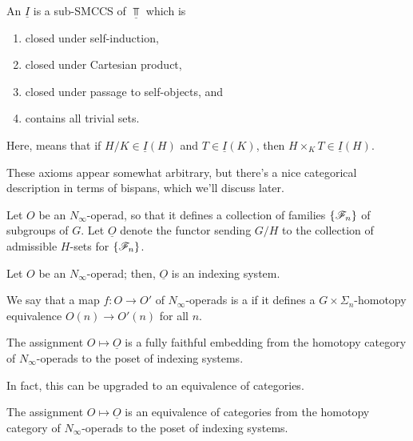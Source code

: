 \begin{defn}
An  $\underline I$ is a sub-SMCCS of $\underline\Top$ which
is
\begin{enumerate}
	\item closed under self-induction,
	\item closed under Cartesian product,
	\item closed under passage to self-objects, and
	\item contains all trivial sets.
\end{enumerate}
Here,  means that if $H/K\in\underline I(H)$ and $T\in\underline I(K)$, then $H\times_K
T\in\underline I(H)$.
\end{defn}
These axioms appear somewhat arbitrary, but there's a nice categorical description in terms of bispans, which we'll
discuss later.
\begin{defn}
Let $O$ be an $N_\infty$-operad, so that it defines a collection of families $\{\mathscr F_n\}$ of subgroups of $G$.
Let $\underline O$ denote the functor sending $G/H$ to the collection of admissible $H$-sets for
$\{\mathscr F_n\}$.
\end{defn}
\begin{prop}
\label{Ninfind}
Let $O$ be an $N_\infty$-operad; then, $\underline O$ is an indexing system.
\end{prop}
We say that a map $f\colon O\to O'$ of $N_\infty$-operads is a  if it defines a
$G\times\Sigma_n$-homotopy equivalence $O(n)\to O'(n)$ for all $n$.
\begin{thm}
The assignment $O\mapsto\underline O$ is a fully faithful embedding from the homotopy category of
$N_\infty$-operads to the poset of indexing systems.
\end{thm}
In fact, this can be upgraded to an equivalence of categories.
\begin{thm}
The assignment $O\mapsto\underline O$ is an equivalence of categories from the homotopy category of
$N_\infty$-operads to the poset of indexing systems.
\end{thm}
